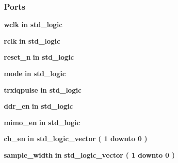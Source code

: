 \subsubsection*{Ports}
 \begin{DoxyCompactItemize}
\item 
{\bf wclk}  {\bfseries {\bfseries \textcolor{keywordflow}{in}\textcolor{vhdlchar}{ }}} {\bfseries \textcolor{comment}{std\+\_\+logic}\textcolor{vhdlchar}{ }} 
\item 
{\bf rclk}  {\bfseries {\bfseries \textcolor{keywordflow}{in}\textcolor{vhdlchar}{ }}} {\bfseries \textcolor{comment}{std\+\_\+logic}\textcolor{vhdlchar}{ }} 
\item 
{\bf reset\+\_\+n}  {\bfseries {\bfseries \textcolor{keywordflow}{in}\textcolor{vhdlchar}{ }}} {\bfseries \textcolor{comment}{std\+\_\+logic}\textcolor{vhdlchar}{ }} 
\item 
{\bf mode}  {\bfseries {\bfseries \textcolor{keywordflow}{in}\textcolor{vhdlchar}{ }}} {\bfseries \textcolor{comment}{std\+\_\+logic}\textcolor{vhdlchar}{ }} 
\item 
{\bf trxiqpulse}  {\bfseries {\bfseries \textcolor{keywordflow}{in}\textcolor{vhdlchar}{ }}} {\bfseries \textcolor{comment}{std\+\_\+logic}\textcolor{vhdlchar}{ }} 
\item 
{\bf ddr\+\_\+en}  {\bfseries {\bfseries \textcolor{keywordflow}{in}\textcolor{vhdlchar}{ }}} {\bfseries \textcolor{comment}{std\+\_\+logic}\textcolor{vhdlchar}{ }} 
\item 
{\bf mimo\+\_\+en}  {\bfseries {\bfseries \textcolor{keywordflow}{in}\textcolor{vhdlchar}{ }}} {\bfseries \textcolor{comment}{std\+\_\+logic}\textcolor{vhdlchar}{ }} 
\item 
{\bf ch\+\_\+en}  {\bfseries {\bfseries \textcolor{keywordflow}{in}\textcolor{vhdlchar}{ }}} {\bfseries \textcolor{comment}{std\+\_\+logic\+\_\+vector}\textcolor{vhdlchar}{ }\textcolor{vhdlchar}{(}\textcolor{vhdlchar}{ }\textcolor{vhdlchar}{ } \textcolor{vhdldigit}{1} \textcolor{vhdlchar}{ }\textcolor{keywordflow}{downto}\textcolor{vhdlchar}{ }\textcolor{vhdlchar}{ } \textcolor{vhdldigit}{0} \textcolor{vhdlchar}{ }\textcolor{vhdlchar}{)}\textcolor{vhdlchar}{ }} 
\item 
{\bf sample\+\_\+width}  {\bfseries {\bfseries \textcolor{keywordflow}{in}\textcolor{vhdlchar}{ }}} {\bfseries \textcolor{comment}{std\+\_\+logic\+\_\+vector}\textcolor{vhdlchar}{ }\textcolor{vhdlchar}{(}\textcolor{vhdlchar}{ }\textcolor{vhdlchar}{ } \textcolor{vhdldigit}{1} \textcolor{vhdlchar}{ }\textcolor{keywordflow}{downto}\textcolor{vhdlchar}{ }\textcolor{vhdlchar}{ } \textcolor{vhdldigit}{0} \textcolor{vhdlchar}{ }\textcolor{vhdlchar}{)}\textcolor{vhdlchar}{ }} 

\end{DoxyCompactItemize}
